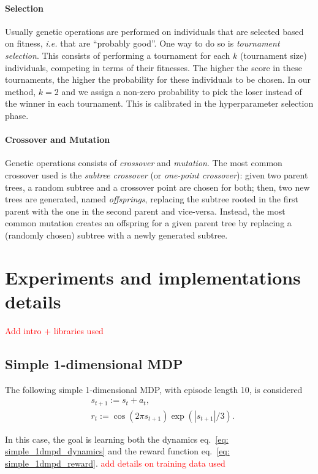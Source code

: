 \documentclass[11pt]{article}
\begin{document}
\paragraph{Selection} Usually genetic operations are performed on individuals that are selected based on fitness, \textsl{i.e.} that are ``probably good''. One way to do so is \textsl{tournament selection}. This consists of performing a tournament for each $k$ (tournament size) individuals, competing in terms of their fitnesses. The higher the score in these tournaments, the higher the probability for these individuals to be chosen. In our method, $k=2$ and we assign a non-zero probability to pick the loser instead of the winner in each tournament. This is calibrated in the hyperparameter selection phase. 

\paragraph{Crossover and Mutation} Genetic operations consists of \textsl{crossover} and \textsl{mutation}. The most common crossover used is the \textsl{subtree crossover} (or \textsl{one-point crossover}): given two parent trees, a random subtree and a crossover point are chosen for both; then, two new trees are generated, named \textsl{offsprings}, replacing the subtree rooted in the first parent with the one in the second parent and vice-versa.
Instead, the most common mutation creates an offspring for a given parent tree by replacing a (randomly chosen) subtree with a newly generated subtree. 

\section{Experiments and implementations details}
\textcolor{red}{Add intro + libraries used}


\subsection{Simple 1-dimensional MDP}
\label{sec: simple_1_dmdp}
The following simple 1-dimensional MDP, with episode length 10, is considered
\begin{align}
	&s_{t+1} := s_t + a_t, \label{eq: simple_1dmpd_dynamics}\\ 
	&r_t := \cos(2\pi s_{t+1})\exp(|s_{t+1}|/3). \label{eq: simple_1dmpd_reward}
\end{align}

In this case, the goal is learning both the dynamics eq.~\eqref{eq: simple_1dmpd_dynamics} and the reward function eq.~\eqref{eq: simple_1dmpd_reward}. \textcolor{red}{add details on training data used}
\end{document}
